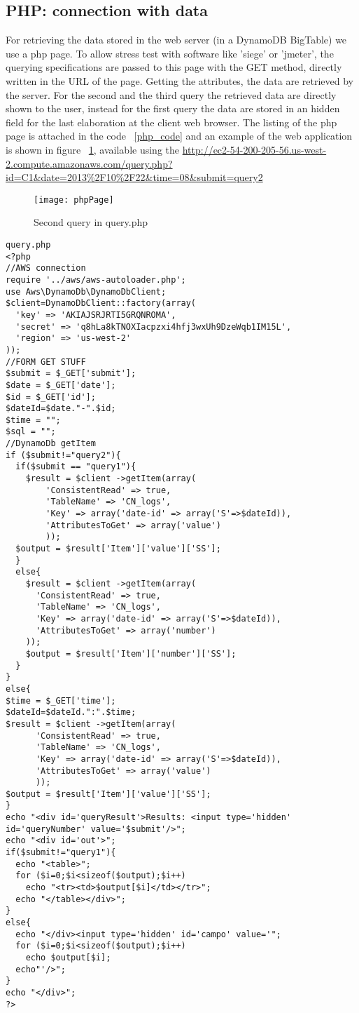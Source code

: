 \documentclass{article}
\begin{document}
\subsection{PHP: connection with data}
For retrieving the data stored in the web server (in a DynamoDB BigTable) we use a php page.
To allow stress test with software like 'siege' or 'jmeter', the querying specifications are passed to this
page with the GET method, directly written in the URL of the page.
Getting the attributes, the data are retrieved by the server. 
For the second and the third query the retrieved data are directly shown to the user, instead for the first 
query the data are stored in an hidden field for the last elaboration at the client web browser.
The listing of the php page is attached in the code ~\ref{php_code} and an example of the web application is
shown in figure ~\ref{phpPage}, available using the \url{http://ec2-54-200-205-56.us-west-2.compute.amazonaws.com/query.php?id=C1&date=2013%2F10%2F22&time=08&submit=query2}
\begin{figure}[H]
      \centering
      \texttt{[image: phpPage]}
      \caption{Second query in query.php}
      \label{phpPage}
\end{figure}
\begingroup \fontsize{7pt}{7pt}\selectfont
\label{php_code}
\begin{verbatim}
query.php
<?php
//AWS connection
require '../aws/aws-autoloader.php';
use Aws\DynamoDb\DynamoDbClient;
$client=DynamoDbClient::factory(array(
  'key' => 'AKIAJSRJRTI5GRQNROMA',
  'secret' => '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',
  'region' => 'us-west-2'
));
//FORM GET STUFF
$submit = $_GET['submit'];
$date = $_GET['date'];
$id = $_GET['id'];
$dateId=$date."-".$id;
$time = "";
$sql = "";
//DynamoDb getItem
if ($submit!="query2"){
  if($submit == "query1"){
    $result = $client ->getItem(array(
        'ConsistentRead' => true,
        'TableName' => 'CN_logs',
        'Key' => array('date-id' => array('S'=>$dateId)),
        'AttributesToGet' => array('value')
        ));
  $output = $result['Item']['value']['SS'];
  }
  else{
    $result = $client ->getItem(array(
      'ConsistentRead' => true,
      'TableName' => 'CN_logs',
      'Key' => array('date-id' => array('S'=>$dateId)),
      'AttributesToGet' => array('number')
    ));
    $output = $result['Item']['number']['SS'];
  }
}
else{
$time = $_GET['time'];
$dateId=$dateId.":".$time;
$result = $client ->getItem(array(
      'ConsistentRead' => true,
      'TableName' => 'CN_logs',
      'Key' => array('date-id' => array('S'=>$dateId)),
      'AttributesToGet' => array('value')
      ));
$output = $result['Item']['value']['SS'];
}
echo "<div id='queryResult'>Results: <input type='hidden' id='queryNumber' value='$submit'/>";
echo "<div id='out'>";
if($submit!="query1"){
  echo "<table>";
  for ($i=0;$i<sizeof($output);$i++)
    echo "<tr><td>$output[$i]</td></tr>";
  echo "</table></div>";
}
else{
  echo "</div><input type='hidden' id='campo' value='";
  for ($i=0;$i<sizeof($output);$i++)
    echo $output[$i];
  echo"'/>";
}
echo "</div>";
?>
\end{verbatim}
\endgroup
\end{document}
